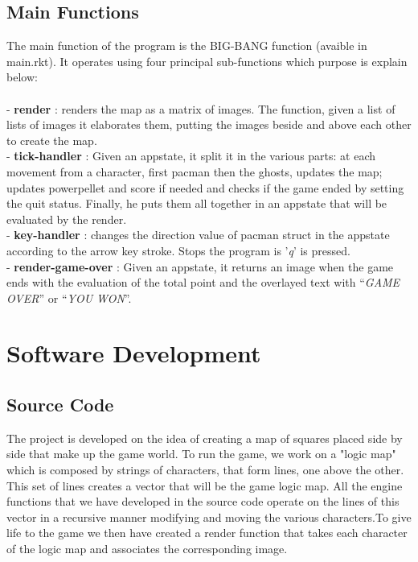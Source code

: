 \documentclass{article}
\begin{document}
\subsection{Main Functions}
The main function of the program is the BIG-BANG function (avaible in main.rkt). It operates using four principal sub-functions which purpose is explain below:\\\\
- \textbf{render} : renders the map as a matrix of images. The function, given a list of lists of images it elaborates them, putting the images beside and above each other to create the map.\\
- \textbf{tick-handler} : Given an appstate, it split it in the various parts: at each movement from a character, first pacman then the ghosts, updates the map; updates powerpellet and score if needed and checks if the game ended by setting the quit status. Finally, he puts them all together in an appstate that will be evaluated by the render.\\
- \textbf{key-handler} : changes the direction value of pacman struct in the appstate according to the arrow key stroke. 
Stops the program is '\textit{q}' is pressed.\\
- \textbf{render-game-over} : Given an appstate, it returns an image when the game ends with the evaluation of the total point and the overlayed text with ``\textit{GAME OVER}'' or ``\textit{YOU WON}''.

\section{Software Development}

\subsection{Source Code}
The project is developed on the idea of creating a map of squares placed side by side that make up the game world. To run the game, we work on a "logic map" which is composed by strings of characters, that form lines, one above the other. This set of lines creates a vector that will be the game logic map. All the engine functions that we have developed in the source code operate on the lines of this vector in a recursive manner modifying and moving the various characters.To give life to the game we then have created a render function that takes each character of the logic map and associates the corresponding image.\\
 
\end{document}
